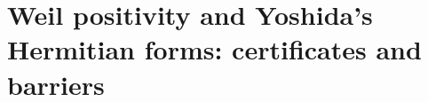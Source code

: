 \chapter{Weil positivity and Yoshida's Hermitian forms: certificates and barriers}\label{vol2:ch14}









